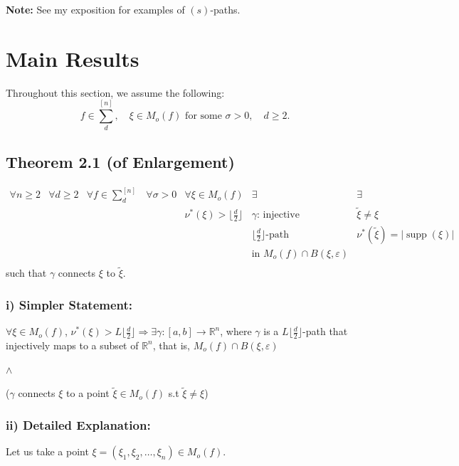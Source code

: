 \documentclass[12pt]{article}
\theoremstyle{definition}
\DeclareMathOperator{\supp}{supp}
\begin{document}
\textbf{Note:} See my exposition for examples of $(s)$-paths.

\vspace{0.5cm}

\section{Main Results}

Throughout this section, we assume the following:
\[
f \in \sum_{d}^{[n]}, \quad \xi \in M_o(f) \text{ for some } \sigma > 0, \quad d \geq 2.
\]

\subsection{Theorem 2.1 (of Enlargement)}
\[
\begin{array}{ccccccc}
\forall n \geq 2 & \forall d \geq 2 & \forall f \in \sum_{d}^{[n]} & \forall \sigma > 0 & \forall \xi \in M_o(f) & \exists & \exists \\
 & & & & \nu^*(\xi) > \lfloor \frac{d}{2} \rfloor & \gamma\text{: injective} & \tilde{\xi} \neq \xi \\
 & & & & & \lfloor \frac{d}{2} \rfloor\text{-path} & \nu^*(\tilde{\xi}) = |\supp(\xi)| \\
 & & & & & \text{in } M_o(f) \cap B(\xi, \varepsilon) & \\
\end{array}
\]
such that $\gamma$ connects $\xi$ to $\tilde{\xi}$.

\subsubsection*{i) Simpler Statement:}

$\forall \xi \in M_o(f)$, $\nu^*(\xi) > L\lfloor \frac{d}{2} \rfloor \Longrightarrow \exists \gamma: [a,b] \to \mathbb{R}^n$, where $\gamma$ is a $L\lfloor \frac{d}{2} \rfloor$-path that injectively maps to a subset of $\mathbb{R}^n$, that is, $M_o(f) \cap B(\xi, \varepsilon)$

$\wedge$

($\gamma$ connects $\xi$ to a point $\tilde{\xi} \in M_o(f)$ s.t $\tilde{\xi} \neq \xi$)

\subsubsection*{ii) Detailed Explanation:}

Let us take a point $\xi = (\xi_1, \xi_2, \ldots, \xi_n) \in M_o(f)$.
\end{document}

